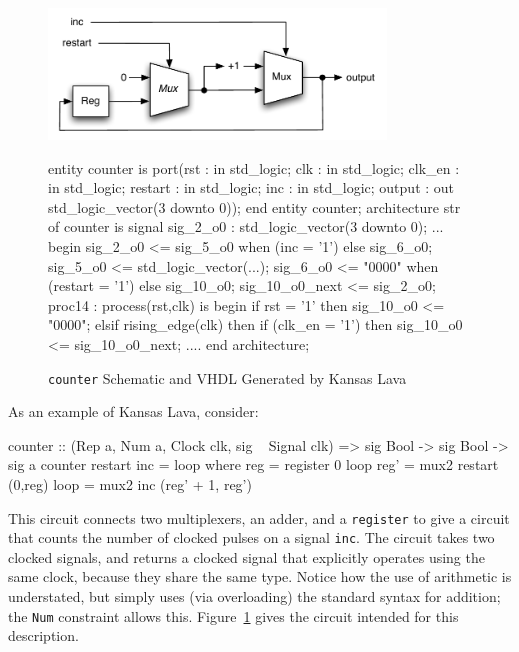 \documentclass[11pt]{article}
\begin{document}
\begin{figure}[!t]
  \centering
  \begin{minipage}{0.5\textwidth}
    \centering
    \includegraphics[width=0.8\textwidth]{images/Counter.pdf}
  \end{minipage}\begin{minipage}{0.5\textwidth}
     \centering
\footnotesize\begin{Code}[fontsize=\tiny]
entity counter is
  port(rst : in std_logic;
       clk : in std_logic;
       clk_en : in std_logic;
       restart : in std_logic;
       inc : in std_logic;
       output : out std_logic_vector(3 downto 0));
end entity counter;
architecture str of counter is
  signal sig_2_o0 : std_logic_vector(3 downto 0);
  ...
begin
  sig_2_o0 <= sig_5_o0 when (inc = '1')  else sig_6_o0;
  sig_5_o0 <= std_logic_vector(...);
  sig_6_o0 <= "0000" when (restart = '1') else sig_10_o0;
  sig_10_o0_next <= sig_2_o0;
  proc14 : process(rst,clk) is
  begin
    if rst = '1' then
      sig_10_o0 <= "0000";
    elsif rising_edge(clk) then
      if (clk_en = '1') then
        sig_10_o0 <= sig_10_o0_next;
  ....
end architecture;
\end{Code}
  \end{minipage}
  \caption{{\tt counter} Schematic and VHDL Generated by Kansas Lava}
  \label{fig:counter-picture}
\end{figure}

As an example of Kansas Lava, consider:

\begin{Code}

counter :: (Rep a, Num a, Clock clk, sig ~ Signal clk) => sig Bool -> sig Bool -> sig a
counter restart inc = loop
   where reg = register 0 loop
	 reg' = mux2 restart (0,reg)
	 loop = mux2 inc (reg' + 1, reg')
\end{Code}

This circuit connects two multiplexers,
an adder,
and a \verb|register|
to give a circuit that counts the number of
clocked pulses on a signal \verb|inc|.
The circuit takes two clocked signals,
and returns a clocked signal that explicitly
operates using the same clock, because they
share the same type.
Notice how the use of arithmetic is understated,
but simply uses (via overloading) the
standard syntax for addition; the {\tt Num}
constraint allows this.
Figure~\ref{fig:counter-picture} gives the
circuit intended for this description.
\end{document}
